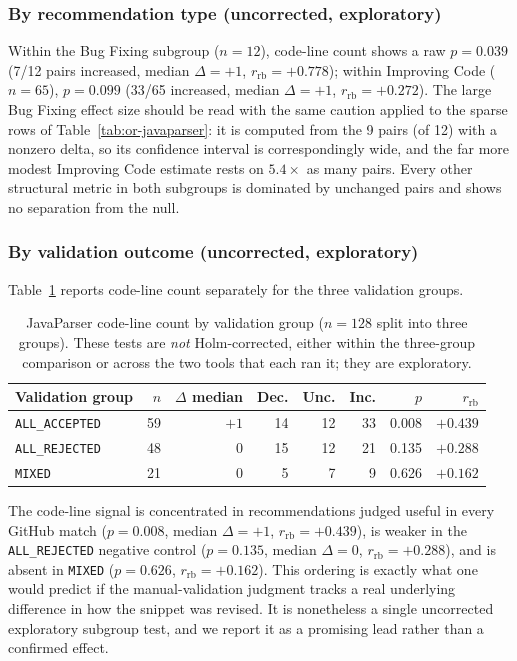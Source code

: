 \subsubsection*{By recommendation type (uncorrected, exploratory)}

Within the Bug Fixing subgroup ($n=12$), code-line count shows a raw $p=0.039$ (7/12 pairs increased, median $\Delta=+1$, $r_{\text{rb}}=+0.778$); within Improving Code ($n=65$), $p=0.099$ (33/65 increased, median $\Delta=+1$, $r_{\text{rb}}=+0.272$).
The large Bug Fixing effect size should be read with the same caution applied to the sparse rows of Table~\ref{tab:or-javaparser}: it is computed from the 9 pairs (of 12) with a nonzero delta, so its confidence interval is correspondingly wide, and the far more modest Improving Code estimate rests on $5.4\times$ as many pairs.
Every other structural metric in both subgroups is dominated by unchanged pairs and shows no separation from the null.

\subsubsection*{By validation outcome (uncorrected, exploratory)}

Table~\ref{tab:or-jp-validation} reports code-line count separately for the three validation groups.

\begin{table}[htbp]
\centering
\caption{JavaParser code-line count by validation group ($n=128$ split into three groups).
These tests are \emph{not} Holm-corrected, either within the three-group comparison or across the two tools that each ran it; they are exploratory.}
\label{tab:or-jp-validation}
\small
\begin{tabular}{lrrrrrrr}
\toprule
Validation group & $n$ & $\Delta$ median & Dec. & Unc. & Inc. & $p$ & $r_{\text{rb}}$ \\
\midrule
\texttt{ALL\_ACCEPTED} & 59 & $+1$ & 14 & 12 & 33 & 0.008 & $+0.439$ \\
\texttt{ALL\_REJECTED} & 48 & $0$  & 15 & 12 & 21 & 0.135 & $+0.288$ \\
\texttt{MIXED}         & 21 & $0$  & 5  & 7  & 9  & 0.626 & $+0.162$ \\
\bottomrule
\end{tabular}
\end{table}

The code-line signal is concentrated in recommendations judged useful in every GitHub match ($p=0.008$, median $\Delta=+1$, $r_{\text{rb}}=+0.439$), is weaker in the \texttt{ALL\_REJECTED} negative control ($p=0.135$, median $\Delta=0$, $r_{\text{rb}}=+0.288$), and is absent in \texttt{MIXED} ($p=0.626$, $r_{\text{rb}}=+0.162$).
This ordering is exactly what one would predict if the manual-validation judgment tracks a real underlying difference in how the snippet was revised.
It is nonetheless a single uncorrected exploratory subgroup test, and we report it as a promising lead rather than a confirmed effect.

